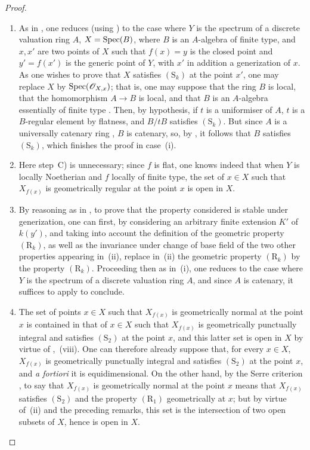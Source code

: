 \begin{proof}
\begin{enumerate}[label=(\roman*)]
  \item[(i)] As in , one reduces (using ) to the case where $Y$ is the spectrum of a discrete valuation ring $A$, $X=\operatorname{Spec}(B)$, where $B$ is an $A$-algebra of finite type, and $x,x'$ are two points of $X$ such that $f(x)=y$ is the closed point and $y'=f(x')$ is the generic point of $Y$, with $x'$ in addition a generization of $x$.
As one wishes to prove that $X$ satisfies $(\mathrm{S}_k)$ at the point $x'$, one may replace $X$ by $\operatorname{Spec}(\mathscr{O}_{X,x})$; that is, one may suppose that the ring $B$ is local, that the homomorphism $A\to B$ is local, and that $B$ is an $A$-algebra essentially of finite type .
Then, by hypothesis, if $t$ is a uniformiser of $A$, $t$ is a $B$-regular element by flatness, and $B/tB$ satisfies $(\mathrm{S}_k)$.
But since $A$ is a universally catenary ring , $B$ is catenary, so, by , it follows that $B$ satisfies $(\mathrm{S}_k)$, which finishes the proof in case~(i).

  \item[(iii)] Here step~C) is unnecessary; since $f$ is flat, one knows indeed  that when $Y$ is locally Noetherian and $f$ locally of finite type, the set of $x\in X$ such that $X_{f(x)}$ is geometrically regular at the point $x$ is open in $X$.

  \item[(ii)] By reasoning as in , to prove that the property considered is stable under generization, one can first, by considering an arbitrary finite extension $K'$ of $k(y')$, and taking into account the definition  of the geometric property $(\mathrm{R}_k)$, as well as the invariance under change of base field of the two other properties appearing in~(ii), replace in~(ii) the geometric property $(\mathrm{R}_k)$ by the property $(\mathrm{R}_k)$.
Proceeding then as in~(i), one reduces to the case where $Y$ is the spectrum of a discrete valuation ring $A$, and since $A$ is catenary, it suffices to apply  to conclude.

  \item[(iv)] The set of points $x\in X$ such that $X_{f(x)}$ is geometrically normal at the point $x$ is contained in that of $x\in X$ such that $X_{f(x)}$ is geometrically punctually integral and satisfies $(\mathrm{S}_2)$ at the point $x$, and this latter set is open in $X$ by virtue of ,~(viii).
One can therefore already suppose that, for every $x\in X$, $X_{f(x)}$ is geometrically punctually integral and satisfies $(\mathrm{S}_2)$ at the point $x$, and \emph{a fortiori} it is equidimensional.
On the other hand, by the Serre criterion , to say that $X_{f(x)}$ is geometrically normal at the point $x$ means that $X_{f(x)}$ satisfies $(\mathrm{S}_2)$ and the property $(\mathrm{R}_1)$ geometrically at $x$;
but by virtue of~(ii) and the preceding remarks, this set is the intersection of two open subsets of $X$, hence is open in $X$.
\end{enumerate}
\end{proof}

